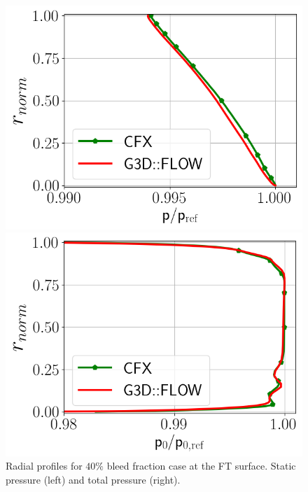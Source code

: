 \begin{figure}[h!]
  \centering
  \begin{minipage}{0.48\columnwidth}
  \includegraphics[width=1.\textwidth]{figures/PAaveB40_FT.png}
  \end{minipage}
  \begin{minipage}{0.48\columnwidth}
  \includegraphics[width=1.\textwidth]{figures/P0MaveB40_FT.png}
  \end{minipage}
  \caption{Radial profiles for $40\%$ bleed fraction case at the FT surface. Static pressure (left) and total pressure (right).} \label{fig:FT40}
\end{figure}

